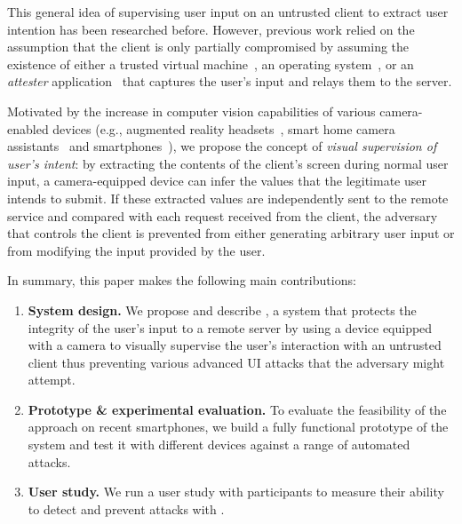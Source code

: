This general idea of supervising user input on an untrusted client to extract user intention has been researched before. However, previous work relied on the assumption that the client is only partially compromised by assuming the existence of either a trusted virtual machine~\cite{gyrus}, an operating system~\cite{binder}, or an \emph{attester} application~\cite{nab} that captures the user's input and relays them to the server.

Motivated by the increase in computer vision capabilities of various camera-enabled devices (e.g., augmented reality headsets~\cite{TimCookAR, HoloLens2}, smart home camera assistants~\cite{fleck2008smart, lenovoSmartHome} and smartphones~\cite{wald2018real, smartphonesCV}), we propose the concept of \emph{visual supervision of user's intent}: by extracting the contents of the client's screen during normal user input, a camera-equipped device can infer the values that the legitimate user intends to submit.
If these extracted values are independently sent to the remote service and compared with each request received from the client, the adversary that controls the client is prevented from either generating arbitrary user input or from modifying the input provided by the user.

In summary, this paper makes the following main contributions:
\begin{enumerate}%
	\item \textbf{System design.}
	We propose and describe \sysname, a system that protects the integrity of the user's input to a remote server by using a device equipped with a camera to visually supervise the user's interaction with an untrusted client thus preventing various advanced UI attacks that the adversary might attempt.


	\item \textbf{Prototype \& experimental evaluation.}
	To evaluate the feasibility of the approach on recent smartphones, we build a fully functional prototype of the \sysname system and test it with  different devices against a range of automated attacks.

	\item \textbf{User study.}
	We run a user study with  participants to measure their ability to detect and prevent attacks with \sysname.

\end{enumerate}




